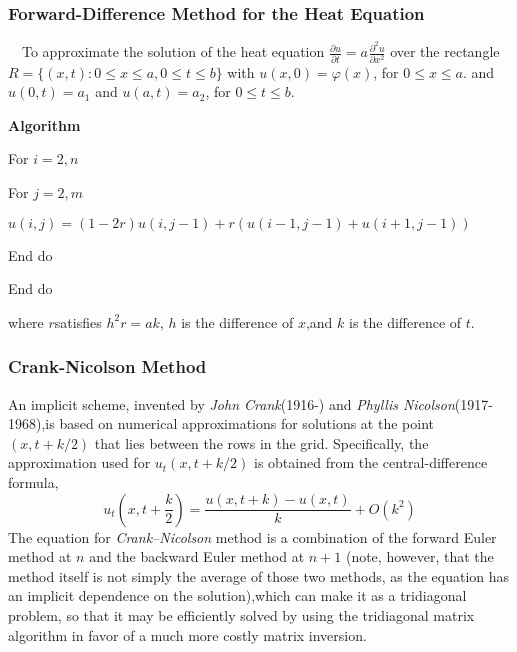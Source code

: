 \documentclass[a4paper]{article}
\newcommand{\tmem}[1]{{\em #1\/}}
\newcommand{\tmtextbf}[1]{{\bfseries{#1}}}
\newcommand{\tmtextup}[1]{{\upshape{#1}}}
\newenvironment{tmindent}{\begin{tmparmod}{1.5em}{0pt}{0pt} }{\end{tmparmod}}
\newenvironment{tmparmod}[3]{\begin{list}{}{\setlength{\topsep}{0pt}\setlength{\leftmargin}{#1}\setlength{\rightmargin}{#2}\setlength{\parindent}{#3}\setlength{\listparindent}{\parindent}\setlength{\itemindent}{\parindent}\setlength{\parsep}{\parskip}} \item[]}{\end{list}}
\newenvironment{tmparsep}[1]{\begingroup\setlength{\parskip}{#1}}{\endgroup}
\begin{document}
\subsubsection{Forward-Difference Method for the Heat Equation}

\ \ To approximate the solution of the heat equation $\frac{\partial
u}{\partial t} = a^{} \frac{\partial^2 u}{\partial x^2}$ over the rectangle $R
=\{(x, t) : 0 \leqslant x \leqslant a, 0 \leqslant t \leqslant b\}$ with $u
(x, 0) = \varphi (x)$, for $0 \leqslant x \leqslant a$. and $u (0, t) = a_1$
and $u (a, t) = a_2$, for $0 \leqslant t \leqslant b$.

{\noindent}\begin{tmparsep}{0em}
  \tmtextbf{Algorithm \tmtextup{3}}{\smallskip}
  \begin{tmindent}
    For $i = 2, n$

    For $j = 2, m$

    $u \left( i, j \right) = \left( 1 - 2 r \right) u \left( i, j - 1 \right)
    + r \left( u \left( i - 1, j - 1 \right) + u \left( i + 1, j - 1 \right)
    \right)$

    End do

    End do
  \end{tmindent}
\end{tmparsep}{\hspace*{\fill}}{\medskip}

where $r$satisfies $h^2 r = a k$, $h$ is the difference of $x$,and $k$ is the
difference of $t$.



\subsubsection{Crank-Nicolson Method}

An implicit scheme, invented by {\tmem{John Crank}}(1916-) and {\tmem{Phyllis
Nicolson}}(1917-1968),is based on numerical approximations for solutions at
the point $(x, t + k / 2)$ that lies between the rows in the grid.
Specifically, the approximation used for $u_t (x, t + k / 2)$ is obtained from
the central-difference formula,
\[ u_t \left( x, t + \frac{k}{2} \right) = \frac{u \left( x, t + k \right) - u
   \left( x, t \right)}{k} + O \left( k^2 \right) \]
The equation for {\tmem{Crank--Nicolson}} method is a combination of the
forward Euler method at $n$ and the backward Euler method at $n + 1$ (note,
however, that the method itself is not simply the average of those two
methods, as the equation has an implicit dependence on the solution),which can
make it as a tridiagonal problem, so that it may be efficiently solved by
using the tridiagonal matrix algorithm in favor of a much more costly matrix
inversion.
\end{document}
